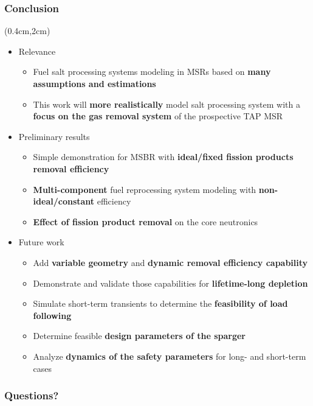 \begin{frame}
\frametitle{Conclusion}
	\begin{textblock*}{12cm}(0.4cm,2cm) %
	\begin{itemize}
		\itemsep1em
		\item Relevance
		\begin{itemize}
			\itemsep0.5em
			\item Fuel salt processing systems modeling in \glspl{MSR} based 
			on \textbf{many assumptions and estimations}
			\item This work will \textbf{more realistically} model salt 
			processing system with a \textbf{focus on the gas removal system}  
			of the prospective \gls{TAP} \gls{MSR}
		\end{itemize} 
		\item Preliminary results
			\begin{itemize}
				\itemsep0.5em
				\item Simple demonstration for \gls{MSBR} with 
				\textbf{ideal/fixed	fission products removal efficiency}
				\item \textbf{Multi-component} fuel reprocessing system 
				modeling with \textbf{non-ideal/constant} 
				efficiency
				\item \textbf{Effect of fission product removal} on the core 
				neutronics
			\end{itemize}
		
		\item Future work
			\begin{itemize}
				\itemsep0.5em
				\item Add \textbf{variable geometry} and \textbf{dynamic 
				removal efficiency capability}
				\item Demonstrate and validate those capabilities for 
				\textbf{lifetime-long depletion}
				\item Simulate short-term transients to determine the 
				\textbf{feasibility of load following}
				\item Determine feasible \textbf{design parameters of the 
				sparger}
				\item Analyze \textbf{dynamics of the safety parameters} for 
				long- and short-term cases
			\end{itemize}
	\end{itemize}
\end{textblock*}
\end{frame}

\begin{frame}
	\frametitle{Questions?}
\end{frame}